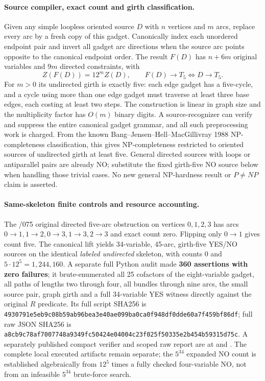 \documentclass[11pt]{article}
\begin{document}
\paragraph{Source compiler, exact count and girth classification.}
Given any simple loopless oriented source $D$ with $n$
vertices and $m$ arcs, replace every arc by a fresh copy
of this gadget. Canonically index each unordered endpoint
pair and invert all gadget arc directions when the source
arc points opposite to the canonical endpoint order.
The result $F(D)$ has $n+6m$ original variables and
$9m$ directed constraints, with
\[
\boxed{Z(F(D))=12^mZ(D),\qquad
       F(D)\to T_5\iff D\to T_5.}
\]
For $m>0$ its undirected girth is exactly five:
each edge gadget has a five-cycle, and a cycle using
more than one edge gadget must traverse at least
three base edges, each costing at least two steps.
The construction is linear in graph size and the
multiplicity factor has $O(m)$ binary digits.
A source-recognizer can verify and suppress the
entire canonical gadget grammar, and all such
preprocessing work is charged. From the known
Bang--Jensen--Hell--MacGillivray 1988 NP-completeness
classification, this gives NP-completeness restricted
to oriented sources of undirected girth at least five.
General directed sources with loops or antiparallel
pairs are already NO; substitute the fixed girth-five
NO source below when handling those trivial cases.
No new general NP-hardness result or $P\ne NP$
claim is asserted.

\paragraph{Same-skeleton finite controls and resource accounting.}
The /075 original directed five-arc obstruction on
vertices $0,1,2,3$ has arcs
$0\to1,1\to2,0\to3,1\to3,2\to3$ and exact
count zero. Flipping only $0\to1$ gives count five.
The canonical lift yields 34-variable, 45-arc,
girth-five YES/NO sources on the identical
\emph{labeled undirected} skeleton, with counts
$0$ and $5\cdot12^5=1{,}244{,}160$.
A separate full Python audit made \textbf{360 assertions
with zero failures}; it brute-enumerated all 25
cofactors of the eight-variable gadget, all paths
of lengths two through four, all bundles through
nine arcs, the small source pair, graph girth and
a full 34-variable YES witness directly against the
original $R$ predicate. Its full script SHA256 is
\texttt{4930791e5eb9c08b59ab96bea3e40ae099ba0ca0f948df0dde60a7f459bf86df};
full raw JSON SHA256 is
\texttt{a8cb9c78af7007748a9349fc50424e04004c23f025f50335e2b454b59315d75c}.
A separately published compact verifier and scoped raw report
are at
and
.
The complete local executed artifacts remain separate;
the $5^{34}$ expanded NO count is established algebraically
from $12^5$ times a fully checked four-variable NO, not
from an infeasible $5^{34}$ brute-force search.
\end{document}
